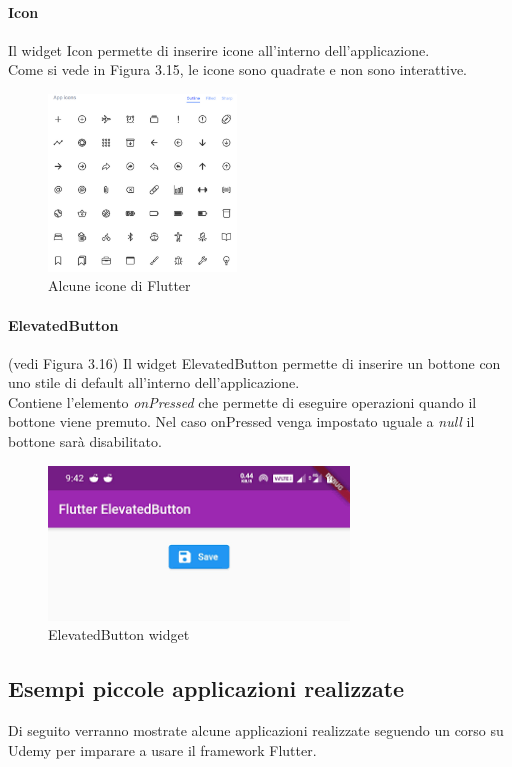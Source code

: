 \paragraph{Icon}
Il widget Icon permette di inserire icone all'interno dell'applicazione.\\
Come si vede in Figura 3.15, le icone sono quadrate e non sono interattive.
\begin{figure}[htbp]	
	\centering
	\includegraphics[width=5cm]{immagini/icon.png}
	\caption{Alcune icone di Flutter}
	\label{fig:Alcune icone di Flutter}
\end{figure}

\paragraph{ElevatedButton} (vedi Figura 3.16)
Il widget ElevatedButton permette di inserire un bottone con uno stile di default all'interno dell'applicazione.\\
Contiene l'elemento \textit{onPressed} che permette di eseguire operazioni quando il bottone viene premuto. Nel caso onPressed venga impostato uguale a \textit{null} il bottone sarà disabilitato.
\begin{figure}[htbp]	
	\centering
	\includegraphics[width=8cm]{immagini/button.png}
	\caption{ElevatedButton widget}
	\label{fig:ElevatedButton widget}
\end{figure}

\newpage

\subsection{Esempi piccole applicazioni realizzate}
Di seguito verranno mostrate alcune applicazioni realizzate seguendo un corso su Udemy \cite{corso} per imparare a usare il framework Flutter.

